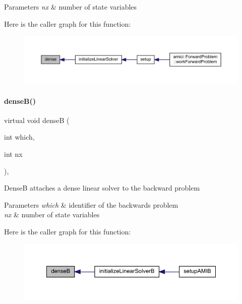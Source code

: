 \begin{DoxyParams}{Parameters}
{\em nx} & number of state variables \\
\hline
\end{DoxyParams}
Here is the caller graph for this function\+:
\nopagebreak
\begin{figure}[H]
\begin{center}
\leavevmode
\includegraphics[width=350pt]{classamici_1_1_solver_ae98355a8a81e3b54c362413e0de2adbc_icgraph}
\end{center}
\end{figure}
\mbox{\label{classamici_1_1_solver_aaa1ecd357b3facae2f2d12784563ad25}} 
\paragraph{\texorpdfstring{dense\+B()}{denseB()}}
{\footnotesize\ttfamily virtual void denseB (\begin{DoxyParamCaption}\item[{int}]{which,  }\item[{int}]{nx }\end{DoxyParamCaption})\hspace{0.3cm}{\ttfamily [protected]}, {}}

DenseB attaches a dense linear solver to the backward problem


\begin{DoxyParams}{Parameters}
{\em which} & identifier of the backwards problem \\
\hline
{\em nx} & number of state variables \\
\hline
\end{DoxyParams}
Here is the caller graph for this function\+:
\nopagebreak
\begin{figure}[H]
\begin{center}
\leavevmode
\includegraphics[width=350pt]{classamici_1_1_solver_aaa1ecd357b3facae2f2d12784563ad25_icgraph}
\end{center}
\end{figure}
\mbox{\label{classamici_1_1_solver_a00863fd76b453dae4e883a6dd5512df3}} 
